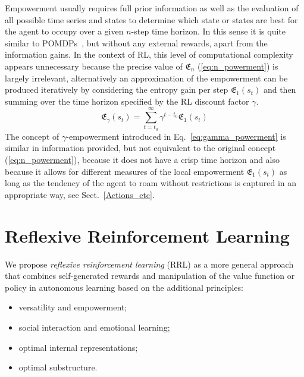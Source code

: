 \documentclass{article}
\begin{document}
Empowerment usually requires full prior information as well as the evaluation of all possible time series and states to determine which state or states are best for the agent to occupy over a given $n$-step time horizon. In this sense it is quite similar to POMDPs~\cite{kaelbling1998planning}, 
but without any external rewards, apart from the information gains.
In the context of RL, this level of computational complexity appears unnecessary because the precise value of $\mathfrak{E}_{n}$ (\ref{eq:n_powerment}) is largely irrelevant, alternatively an approximation of the empowerment can be produced iteratively by considering the entropy gain per step 
$\mathfrak{E}_{1}\left(s_{t}\right)$ and then summing over the time
horizon specified by the RL discount factor $\gamma$.
\begin{equation}
	\mathfrak{E}_{\gamma}\left(s_{t}\right)=\sum_{t=t_0}^\infty
	\gamma^{t-t_0}\mathfrak{E}_{1}\left(s_{t}\right)
	\label{eq:gamma_powerment}
\end{equation}
The concept of $\gamma$-empowerment introduced in 
Eq.~\ref{eq:gamma_powerment} is similar in information provided, but not equivalent to the original 
concept (\ref{eq:n_powerment}), because it does not have a 
crisp time horizon and also because it allows for different 
measures of the local empowerment 
$\mathfrak{E}_{1}\left(s_{t}\right)$ as long as 
the tendency of the agent to roam without restrictions is captured in
an appropriate way, see Sect.~\ref{Actions_etc}.

\section{Reflexive Reinforcement Learning} \label{reflexive}
We propose \emph{reflexive reinforcement learning} (RRL) as a more general approach that combines self-generated rewards and manipulation of the
value function or policy in autonomous learning based on the additional principles:
\begin{itemize}
\item versatility and empowerment;
\item social interaction and emotional learning;
\item optimal internal representations;
\item optimal substructure.
\end{itemize}
\end{document}
